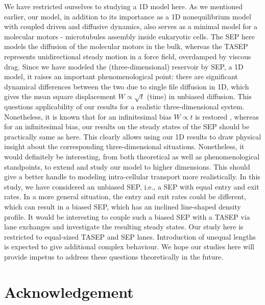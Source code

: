 \documentclass[aps,pre,twocolumn,superscriptaddress,amsmath,amssymb,longbibliography,floatfix]{revtex4}
\begin{document}
{We have restricted ourselves to studying a 1D model here. As we mentioned earlier, our model, in addition to its importance as a 
1D nonequilibrium model with coupled driven and diffusive dynamics, also serves as a minimal
model for a molecular motors - microtubules assembly inside eukaryotic cells. The SEP here models the diffusion
of the molecular motors in the bulk, whereas the TASEP represents unidirectional
steady motion in a force field, overdamped by viscous drag. Since we have modeled
the (three-dimensional) reservoir by SEP, a 1D model, it raises an important phenomenological point: there are significant dynamical differences
between the two due to single file diffusion in 1D, which gives the mean square displacement $W\propto \sqrt
t$ (time) \cite{1ddiff} in unbiased diffusion. This questions applicability of our results for a realistic three-dimensional system. Nonetheless, it is known that for an infinitesimal bias $W\propto t$ is restored
\cite{bias1,bias2}, whereas for an infinitesimal bias, our results on the steady states of the SEP should be practically same as here. This clearly allows using our 1D results to draw physical insight about the corresponding three-dimensional situations. Nonetheless, it would definitely be interesting, from both theoretical as well as phenomenological standpoints, to extend and study our model to higher dimensions. This should give a better handle to modeling intra-cellular transport more realistically. In this study, we have considered an unbiased SEP, i.e., a SEP with equal entry and exit rates. In a more general situation, the entry and exit rates could be different, which can result in a biased SEP, which has an inclined line-shaped density profile. It would be interesting to couple such a biased SEP with a TASEP via lane exchanges and investigate the resulting steady states. Our study here is restricted to equal-sized TASEP and SEP lanes. Introduction of unequal lengths is expected to give additional complex behaviour. We hope our studies here will provide impetus to address these questions theoretically in the future.



\section{Acknowledgement}

}
\end{document}
